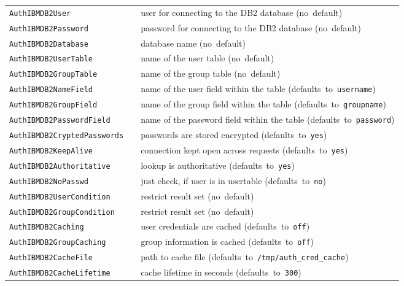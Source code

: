 \documentclass[11pt,a4paper]{article}
\begin{document}
\begin{tabular}{@{} ll >{\raggedright\arraybackslash}p{ 50ex } @{}}
{\tt AuthIBMDB2User} & & user for connecting to the DB2 database \mbox{(no default)} \\

{\tt AuthIBMDB2Password} & & password for connecting to the DB2 database \mbox{(no default)} \\

{\tt AuthIBMDB2Database} & & database name \mbox{(no default)} \\

{\tt AuthIBMDB2UserTable} & & name of the user table \mbox{(no default)} \\

{\tt AuthIBMDB2GroupTable} & & name of the group table \mbox{(no default)} \\

{\tt AuthIBMDB2NameField} & & name of the user field within the table \mbox{(defaults to {\tt username})} \\

{\tt AuthIBMDB2GroupField} & & name of the group field within the table \mbox{(defaults to {\tt groupname})} \\

{\tt AuthIBMDB2PasswordField} & & name of the password field within the table \mbox{(defaults to {\tt password})} \\

{\tt AuthIBMDB2CryptedPasswords} & & passwords are stored encrypted \mbox{(defaults to {\tt yes})} \\

{\tt AuthIBMDB2KeepAlive} & & connection kept open across requests \mbox{(defaults to {\tt yes})} \\

{\tt AuthIBMDB2Authoritative} & & lookup is authoritative \mbox{(defaults to {\tt yes})} \\ 

{\tt AuthIBMDB2NoPasswd} & & just check, if user is in usertable \mbox{(defaults to {\tt no})} \\

{\tt AuthIBMDB2UserCondition} & & restrict result set \mbox{(no default)} \\

{\tt AuthIBMDB2GroupCondition} & & restrict result set \mbox{(no default)} \\

{\tt AuthIBMDB2Caching} & & user credentials are cached \mbox{(defaults to {\tt off})} \\

{\tt AuthIBMDB2GroupCaching} & & group information is cached \mbox{(defaults to {\tt off})} \\

{\tt AuthIBMDB2CacheFile} & & path to cache file \mbox{(defaults to {\tt /tmp/auth\_cred\_cache})} \\

{\tt AuthIBMDB2CacheLifetime} & & cache lifetime in seconds \mbox{(defaults to {\tt 300})} \\
\end{tabular}
\end{document}

